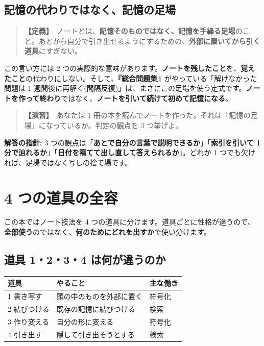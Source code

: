 \documentclass{article}
\begin{document}
\subsection{記憶の代わりではなく、記憶の足場}

\begin{quote}
\textbf{【定義】}\ ノートとは、\textbf{記憶そのものではなく、記憶を手繰る足場}のこと。あとから自分で引き出せるようにするための、\textbf{外部に置いてから引く道具}にすぎない。\end{quote}

この言い方には 2 つの実際的な意味があります。\textbf{ノートを残したこと}を、\textbf{覚えたこと}の代わりにしない。そして、\textbf{『総合問題集』}がやっている「解けなかった問題は 1 週間後に再解く(間隔反復)」は、まさにこの足場を使う定式です。\textbf{ノートを作って終わり}ではなく、\textbf{ノートを引いて続けて初めて記憶になる}。

\begin{quote}
\textbf{【演習】}\ あなたは 1 冊の本を読んでノートを作った。それは「記憶の足場」になっているか。判定の観点を 3 つ挙げよ。
\end{quote}

\textbf{解答の指針:} 3 つの観点は「\textbf{あとで自分の言葉で説明できるか}」「\textbf{索引を引いて 1 分で辿れるか}」「\textbf{日付を隔てて出し直して答えられるか}」。どれか 1 つでも欠ければ、足場ではなく写しの捨て場です。

\section{4 つの道具の全容}

この本ではノート技法を 4 つの道具に分けます。道具ごとに性格が違うので、\textbf{全部使う}のではなく、\textbf{何のためにどれを出すか}で使い分けます。

\subsection{道具 1・2・3・4 は何が違うのか}

\begin{center}
\begin{tabular}{|l|l|l|}
\hline
道具 & やること & 主な働き \\
\hline
1 書き写す & 頭の中のものを外部に置く & 符号化 \\
\hline
2 結びつける & 既存の記憶に結びつける & 検索 \\
\hline
3 作り変える & 自分の形に変える & 符号化 \\
\hline
4 引き出す & 隠して引き出そうとする & 検索 \\
\hline
\end{tabular}
\end{center}
\end{document}
